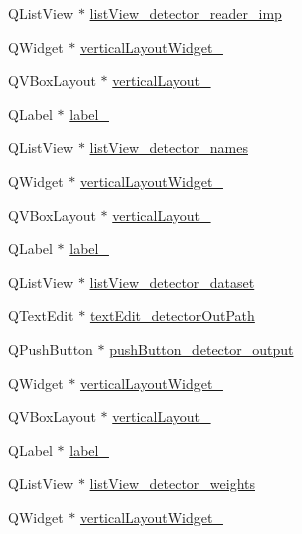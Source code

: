 \begin{DoxyCompactItemize}
Q\+List\+View $\ast$ \hyperlink{class_ui___main_window_ac468e28fb31b524124699c6d82b52c7d}{list\+View\+\_\+detector\+\_\+reader\+\_\+imp}
\item 
Q\+Widget $\ast$ \hyperlink{class_ui___main_window_aaa47c5da3d54ebfb6692366356f4ea61}{vertical\+Layout\+Widget\+\_}
\item 
Q\+V\+Box\+Layout $\ast$ \hyperlink{class_ui___main_window_a22115df48ffb70e4c1386c3a6f0c2bdb}{vertical\+Layout\+\_}
\item 
Q\+Label $\ast$ \hyperlink{class_ui___main_window_a4a18586583a48765b392cbab0ea7545c}{label\+\_}
\item 
Q\+List\+View $\ast$ \hyperlink{class_ui___main_window_a928261b5defb8af34625975627d04d55}{list\+View\+\_\+detector\+\_\+names}
\item 
Q\+Widget $\ast$ \hyperlink{class_ui___main_window_a3c72c6d2de9cc760d70ab3628bd93441}{vertical\+Layout\+Widget\+\_}
\item 
Q\+V\+Box\+Layout $\ast$ \hyperlink{class_ui___main_window_a45a1fe3ab2eb20f88e396075d5ed35f6}{vertical\+Layout\+\_}
\item 
Q\+Label $\ast$ \hyperlink{class_ui___main_window_aa7d5a218f527f204fa7f544dc8c024a7}{label\+\_}
\item 
Q\+List\+View $\ast$ \hyperlink{class_ui___main_window_a2d575ad3c8ce7182fd7bd21c35dcfc97}{list\+View\+\_\+detector\+\_\+dataset}
\item 
Q\+Text\+Edit $\ast$ \hyperlink{class_ui___main_window_ae24694798a758d641c7b8e05ab045ca8}{text\+Edit\+\_\+detector\+Out\+Path}
\item 
Q\+Push\+Button $\ast$ \hyperlink{class_ui___main_window_a3a1a35e5655aaa97ba672356b4279e6d}{push\+Button\+\_\+detector\+\_\+output}
\item 
Q\+Widget $\ast$ \hyperlink{class_ui___main_window_a54068238a3fef80bae072b300edd4b4a}{vertical\+Layout\+Widget\+\_}
\item 
Q\+V\+Box\+Layout $\ast$ \hyperlink{class_ui___main_window_a1dd03599a38ab88cc01201488e5786b4}{vertical\+Layout\+\_}
\item 
Q\+Label $\ast$ \hyperlink{class_ui___main_window_a7a9350c6de61e7051850744487d910bd}{label\+\_}
\item 
Q\+List\+View $\ast$ \hyperlink{class_ui___main_window_afdd750864ccd329e73e6b8613b3bee22}{list\+View\+\_\+detector\+\_\+weights}
\item 
Q\+Widget $\ast$ \hyperlink{class_ui___main_window_a0336e57aec6620c8231b2452f98eb7ee}{vertical\+Layout\+Widget\+\_}

\end{DoxyCompactItemize}
